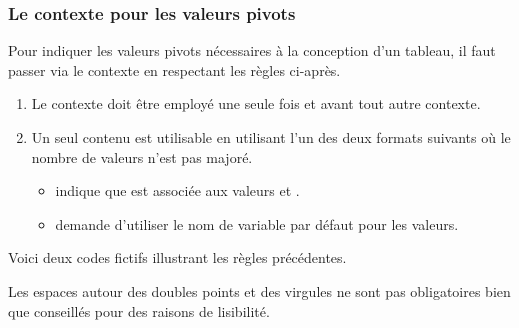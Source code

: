 \documentclass[10pt, a4paper]{article}
\begin{document}

\subsubsection{Le contexte  pour les valeurs pivots}
\label{tns-math-functab-ctxt-bounds}

Pour indiquer les valeurs pivots nécessaires à la conception d'un tableau, il faut passer via le contexte  en respectant les règles ci-après.
\begin{enumerate}
    \item Le contexte  doit être employé une seule fois et avant tout autre contexte.


    \item Un seul contenu est utilisable en utilisant l'un des deux formats suivants où le nombre de valeurs n'est pas majoré.
    \begin{itemize}
        \item {} indique que  est associée aux valeurs  et  .

        \item {} demande d'utiliser le nom de variable par défaut pour les valeurs.
    \end{itemize}
\end{enumerate}


\medskip


Voici deux codes fictifs illustrant les règles précédentes.
\begin{multicols}{2}

\end{multicols}




\begin{tdocnote}
    Les espaces autour des doubles points et des virgules ne sont pas obligatoires bien que conseillés pour des raisons de lisibilité.
\end{tdocnote}
\end{document}
